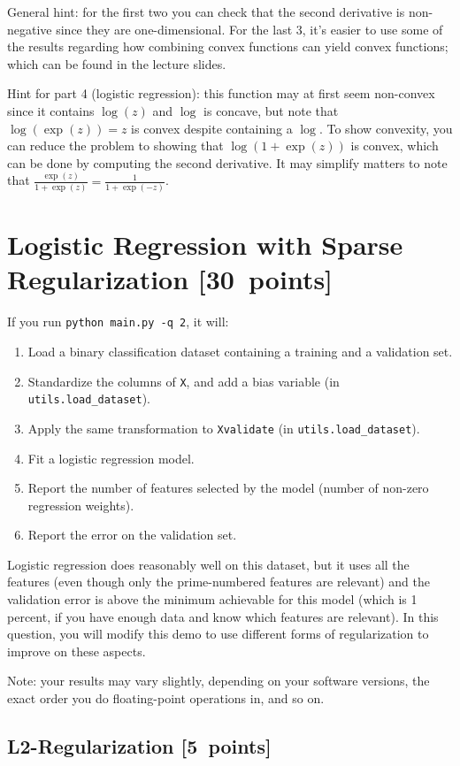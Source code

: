 \documentclass{article}
\newcommand\pts[1]{\textcolor{pointscolour}{[#1~points]}}
\begin{document}
General hint: for the first two you can check that the second derivative is non-negative since they are one-dimensional. For the last 3, it's easier to use some of the results regarding how combining convex functions can yield convex functions; which can be found in the lecture slides.

Hint for part 4 (logistic regression): this function may at first seem non-convex since it contains $\log(z)$ and $\log$ is concave, but note that $\log(\exp(z))=z$ is convex despite containing a $\log$. To show convexity, you can reduce the problem to showing that $\log(1+\exp(z))$ is convex, which can be done by computing the second derivative. It may simplify matters to note that $\frac{\exp(z)}{1+\exp(z)} = \frac{1}{1+\exp(-z)}$.


\clearpage
\section{Logistic Regression with Sparse Regularization \pts{30}}

If you run  \verb|python main.py -q 2|, it will:
\begin{enumerate}
\item Load a binary classification dataset containing a training and a validation set.
\item Standardize the columns of \verb|X|, and add a bias variable (in \verb|utils.load_dataset|).
\item Apply the same transformation to \verb|Xvalidate| (in \verb|utils.load_dataset|).
\item Fit a logistic regression model.
\item Report the number of features selected by the model (number of non-zero regression weights).
\item Report the error on the validation set.
\end{enumerate}
Logistic regression does reasonably well on this dataset,
but it uses all the features (even though only the prime-numbered features are relevant)
and the validation error is above the minimum achievable for this model
(which is 1 percent, if you have enough data and know which features are relevant).
In this question, you will modify this demo to use different forms of regularization
 to improve on these aspects.

Note: your results may vary slightly, depending on your software versions, the exact order you do floating-point operations in, and so on.


\subsection{L2-Regularization \pts{5}}
\end{document}
